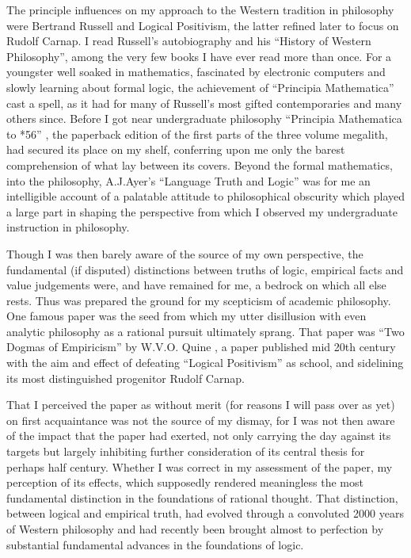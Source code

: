 \documentclass[10pt,titlepage]{book}
\begin{document}
The principle influences on my approach to the Western tradition in philosophy were Bertrand Russell and Logical Positivism, the latter refined later to focus on Rudolf Carnap.
I read Russell's autobiography and his ``History of Western Philosophy'', among the very few books I have ever read more than once.
For a youngster well soaked in mathematics, fascinated by electronic computers and slowly learning about formal logic, the achievement of ``Principia Mathematica'' cast a spell, as it had for many of Russell's most gifted contemporaries and many others since.
Before I got near undergraduate philosophy ``Principia Mathematica to *56'' \cite{russell1970}, the paperback edition of the first parts of the three volume megalith, had secured its place on my shelf, conferring upon me only the barest comprehension of what lay between its covers.
Beyond the formal mathematics, into the philosophy, A.J.Ayer's ``Language Truth and Logic'' \cite{ayer1936} was for me an intelligible account of a palatable attitude to philosophical obscurity which played a large part in shaping the perspective from which I observed my undergraduate instruction in philosophy.

Though I was then barely aware of the source of my own perspective, the fundamental (if disputed) distinctions between truths of logic,  empirical facts and value judgements were, and have remained for me, a bedrock on which all else rests.
Thus was prepared the ground for my scepticism of academic philosophy.
One famous paper was the seed from which my utter disillusion with even analytic philosophy as a rational pursuit ultimately sprang.
That paper was ``Two Dogmas of Empiricism'' by W.V.O. Quine \cite{quine51}, a paper published mid 20th century with the aim and effect of defeating ``Logical Positivism'' as school, and sidelining its most distinguished progenitor Rudolf Carnap.

That I perceived the paper as without merit (for reasons I will pass over as yet) on first acquaintance was not the source of my dismay, for I was not then aware of the impact that the paper had exerted, not only carrying the day against its targets but largely inhibiting further consideration of its central thesis for perhaps half century.
Whether I was correct in my assessment of the paper, my perception of its effects, which supposedly rendered meaningless the most fundamental distinction in the foundations of rational thought.
That distinction, between logical and empirical truth, had evolved through a convoluted 2000 years of Western philosophy and had recently been brought almost to perfection by substantial fundamental advances in the foundations of logic.
\end{document}
